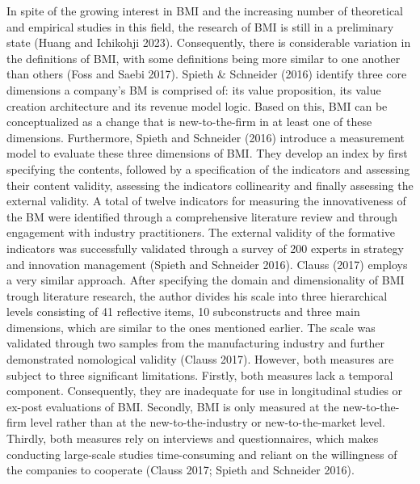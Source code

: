 \documentclass[
]{article}
\begin{document}
In spite of the growing interest in BMI and the increasing number of
theoretical and empirical studies in this field, the research of BMI is
still in a preliminary state (Huang and Ichikohji 2023). Consequently,
there is considerable variation in the definitions of BMI, with some
definitions being more similar to one another than others (Foss and
Saebi 2017). Spieth \& Schneider (2016) identify three core dimensions a
company's BM is comprised of: its value proposition, its value creation
architecture and its revenue model logic. Based on this, BMI can be
conceptualized as a change that is new-to-the-firm in at least one of
these dimensions. Furthermore, Spieth and Schneider (2016) introduce a
measurement model to evaluate these three dimensions of BMI. They
develop an index by first specifying the contents, followed by a
specification of the indicators and assessing their content validity,
assessing the indicators collinearity and finally assessing the external
validity. A total of twelve indicators for measuring the innovativeness
of the BM were identified through a comprehensive literature review and
through engagement with industry practitioners. The external validity of
the formative indicators was successfully validated through a survey of
200 experts in strategy and innovation management (Spieth and Schneider
2016). Clauss (2017) employs a very similar approach. After specifying
the domain and dimensionality of BMI trough literature research, the
author divides his scale into three hierarchical levels consisting of 41
reflective items, 10 subconstructs and three main dimensions, which are
similar to the ones mentioned earlier. The scale was validated through
two samples from the manufacturing industry and further demonstrated
nomological validity (Clauss 2017). However, both measures are subject
to three significant limitations. Firstly, both measures lack a temporal
component. Consequently, they are inadequate for use in longitudinal
studies or ex-post evaluations of BMI. Secondly, BMI is only measured at
the new-to-the-firm level rather than at the new-to-the-industry or
new-to-the-market level. Thirdly, both measures rely on interviews and
questionnaires, which makes conducting large-scale studies
time-consuming and reliant on the willingness of the companies to
cooperate (Clauss 2017; Spieth and Schneider 2016).
\end{document}
